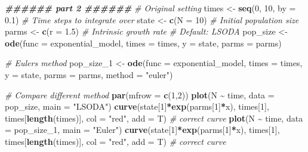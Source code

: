 \documentclass[
]{book}
\newenvironment{Shaded}{\begin{snugshade}}{\end{snugshade}}
\newcommand{\AttributeTok}[1]{\textcolor[rgb]{0.13,0.29,0.53}{#1}}
\newcommand{\CommentTok}[1]{\textcolor[rgb]{0.56,0.35,0.01}{\textit{#1}}}
\newcommand{\DecValTok}[1]{\textcolor[rgb]{0.00,0.00,0.81}{#1}}
\newcommand{\DocumentationTok}[1]{\textcolor[rgb]{0.56,0.35,0.01}{\textbf{\textit{#1}}}}
\newcommand{\FloatTok}[1]{\textcolor[rgb]{0.00,0.00,0.81}{#1}}
\newcommand{\FunctionTok}[1]{\textcolor[rgb]{0.13,0.29,0.53}{\textbf{#1}}}
\newcommand{\NormalTok}[1]{#1}
\newcommand{\OtherTok}[1]{\textcolor[rgb]{0.56,0.35,0.01}{#1}}
\newcommand{\SpecialCharTok}[1]{\textcolor[rgb]{0.81,0.36,0.00}{\textbf{#1}}}
\newcommand{\StringTok}[1]{\textcolor[rgb]{0.31,0.60,0.02}{#1}}
\begin{document}
\begin{Shaded}
\begin{Highlighting}[]
\DocumentationTok{\#\#\#\#\#\# part 2 \#\#\#\#\#\#}
\CommentTok{\# Original setting}
\NormalTok{times }\OtherTok{\textless{}{-}} \FunctionTok{seq}\NormalTok{(}\DecValTok{0}\NormalTok{, }\DecValTok{10}\NormalTok{, }\AttributeTok{by =} \FloatTok{0.1}\NormalTok{)  }\CommentTok{\# Time steps to integrate over}
\NormalTok{state }\OtherTok{\textless{}{-}} \FunctionTok{c}\NormalTok{(}\AttributeTok{N =} \DecValTok{10}\NormalTok{)  }\CommentTok{\# Initial population size}
\NormalTok{parms }\OtherTok{\textless{}{-}} \FunctionTok{c}\NormalTok{(}\AttributeTok{r =} \FloatTok{1.5}\NormalTok{)  }\CommentTok{\# Intrinsic growth rate}
\CommentTok{\# Default: LSODA}
\NormalTok{pop\_size }\OtherTok{\textless{}{-}} \FunctionTok{ode}\NormalTok{(}\AttributeTok{func =}\NormalTok{ exponential\_model, }\AttributeTok{times =}\NormalTok{ times, }\AttributeTok{y =}\NormalTok{ state, }\AttributeTok{parms =}\NormalTok{ parms)}

\CommentTok{\# Euler\textquotesingle{}s method}
\NormalTok{pop\_size\_1 }\OtherTok{\textless{}{-}} \FunctionTok{ode}\NormalTok{(}\AttributeTok{func =}\NormalTok{ exponential\_model, }\AttributeTok{times =}\NormalTok{ times, }\AttributeTok{y =}\NormalTok{ state, }\AttributeTok{parms =}\NormalTok{ parms, }\AttributeTok{method =} \StringTok{"euler"}\NormalTok{)}

\CommentTok{\# Compare different method}
\FunctionTok{par}\NormalTok{(}\AttributeTok{mfrow =} \FunctionTok{c}\NormalTok{(}\DecValTok{1}\NormalTok{,}\DecValTok{2}\NormalTok{))}
\FunctionTok{plot}\NormalTok{(N }\SpecialCharTok{\textasciitilde{}}\NormalTok{ time, }\AttributeTok{data =}\NormalTok{ pop\_size, }\AttributeTok{main =} \StringTok{"LSODA"}\NormalTok{)}
\FunctionTok{curve}\NormalTok{(state[}\DecValTok{1}\NormalTok{]}\SpecialCharTok{*}\FunctionTok{exp}\NormalTok{(parms[}\DecValTok{1}\NormalTok{]}\SpecialCharTok{*}\NormalTok{x), times[}\DecValTok{1}\NormalTok{], times[}\FunctionTok{length}\NormalTok{(times)], }\AttributeTok{col =} \StringTok{"red"}\NormalTok{, }\AttributeTok{add =}\NormalTok{ T) }\CommentTok{\# correct curve}
\FunctionTok{plot}\NormalTok{(N }\SpecialCharTok{\textasciitilde{}}\NormalTok{ time, }\AttributeTok{data =}\NormalTok{ pop\_size\_1, }\AttributeTok{main =} \StringTok{"Euler"}\NormalTok{)}
\FunctionTok{curve}\NormalTok{(state[}\DecValTok{1}\NormalTok{]}\SpecialCharTok{*}\FunctionTok{exp}\NormalTok{(parms[}\DecValTok{1}\NormalTok{]}\SpecialCharTok{*}\NormalTok{x), times[}\DecValTok{1}\NormalTok{], times[}\FunctionTok{length}\NormalTok{(times)], }\AttributeTok{col =} \StringTok{"red"}\NormalTok{, }\AttributeTok{add =}\NormalTok{ T) }\CommentTok{\# correct curve}
\end{Highlighting}
\end{Shaded}
\end{document}
